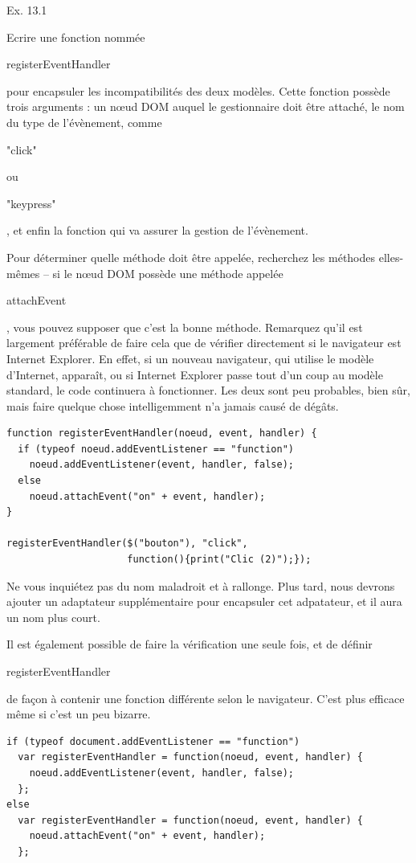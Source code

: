 \documentclass{FramateX}
\renewcommand{\texttt}[1]{\begin{sffamily}{#1}\end{sffamily}}
\begin{document}
\begin{center}\end{center}

Ex. 13.1

Ecrire une fonction nommée \texttt{registerEventHandler} pour encapsuler
les incompatibilités des deux modèles. Cette fonction possède trois
arguments : un nœud DOM auquel le gestionnaire doit être attaché, le nom
du type de l'évènement, comme \texttt{"click"} ou \texttt{"keypress"},
et enfin la fonction qui va assurer la gestion de l'évènement.

Pour déterminer quelle méthode doit être appelée, recherchez les
méthodes elles-mêmes -- si le nœud DOM possède une méthode appelée
\texttt{attachEvent}, vous pouvez supposer que c'est la bonne méthode.
Remarquez qu'il est largement préférable de faire cela que de vérifier
directement si le navigateur est Internet Explorer. En effet, si un
nouveau navigateur, qui utilise le modèle d'Internet, apparaît, ou si
Internet Explorer passe tout d'un coup au modèle standard, le code
continuera à fonctionner. Les deux sont peu probables, bien sûr, mais
faire quelque chose intelligemment n'a jamais causé de dégâts.

\begin{lstlisting}
function registerEventHandler(noeud, event, handler) {
  if (typeof noeud.addEventListener == "function")
    noeud.addEventListener(event, handler, false);
  else
    noeud.attachEvent("on" + event, handler);
}

registerEventHandler($("bouton"), "click",
                     function(){print("Clic (2)");});
\end{lstlisting}
Ne vous inquiétez pas du nom maladroit et à rallonge. Plus tard, nous
devrons ajouter un adaptateur supplémentaire pour encapsuler cet
adpatateur, et il aura un nom plus court.

Il est également possible de faire la vérification une seule fois, et de
définir \texttt{registerEventHandler} de façon à contenir une fonction
différente selon le navigateur. C'est plus efficace même si c'est un peu
bizarre.

\begin{lstlisting}
if (typeof document.addEventListener == "function")
  var registerEventHandler = function(noeud, event, handler) {
    noeud.addEventListener(event, handler, false);
  };
else
  var registerEventHandler = function(noeud, event, handler) {
    noeud.attachEvent("on" + event, handler);
  };
\end{lstlisting}
\begin{center}\end{center}
\end{document}
